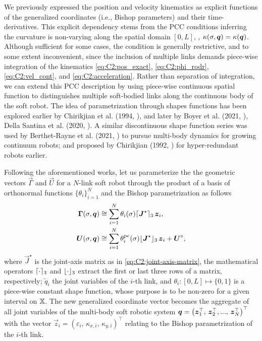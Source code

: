 \noindent We previously expressed the position and velocity kinematics as explicit functions of the generalized coordinates (i.e., Bishop parameters) and their time-derivatives. This explicit dependency stems from the PCC conditions inferring the curvature is non-varying along the spatial domain $[0,L]$, \ie, $\kappa(\sigma,{\boldsymbol{q}}) = \kappa({\boldsymbol{q}})$. Although sufficient for some cases, the condition is generally restrictive, and to some extent inconvenient, since the inclusion of multiple links demands piece-wise integration of the kinematics \eqref{eq:C2:pos_exact}, \eqref{eq:C2:phi_rodr}, \eqref{eq:C2:vel_cont}, and \eqref{eq:C2:acceleration}. Rather than separation of integration, we can extend this PCC description by using piece-wise continuous spatial function to distinguishes multiple soft-bodied links along the continuous body of the soft robot. The idea of parametrization through shapes functions has been explored earlier by Chirikjian et al. (1994,
\cite{Chirikjian1994,Chirikjian1992}), and later by Boyer et al. (2021, \cite{Boyer2021}), Della Santina et al. (2020, \cite{DellaSantina2020}). A similar discontinuous shape function series was used by Berthet-Rayne et al. (2021, \cite{Berthet2021}) to pursue multi-body dynamics for growing continuum robots; and proposed by Chirikjian (1992,
\cite{Chirikjian1992}) for hyper-redundant robots earlier.

Following the aforementioned works, let us parameterize the the geometric vectors $\vec{\Gamma}$ and $\vec{U}$ for a $N$-link soft robot through the product of a basis of orthonormal functions $\!\{\theta_i\}_{i=1}^{N}$ and the Bishop parametrization as follows
%
\begin{align} \boldsymbol{\Gamma}(\sigma,{\boldsymbol{q}}) & \cong \sum^N_{i=1} \theta_i(\sigma) \lceil{\boldsymbol{J}}^\star\rceil_3
\,\boldsymbol{z}_i, \label{eq:C2:theta_extent} \\ \boldsymbol{U}(\sigma,{\boldsymbol{q}}) & \cong \sum^N_{i=1} \theta^{\textrm{pc}}_i(\sigma)
\lfloor{\boldsymbol{J}}^\star\rfloor_3\,\boldsymbol{z}_i + {\boldsymbol{U}}^\circ, \label{eq:C2:h_extent} \end{align}
%
where $\vec{J}^\star$ is the joint-axis matrix as in \eqref{eq:C2:joint-axis-matrix}, the mathematical operators $\lceil\cdot\rceil_3$ and $\lfloor\cdot\rfloor_3$  extract the first or last three rows of a matrix, respectively;  $\tilde{q}_i$ the joint variables of the $i$-th link, and $\theta_i: [0,L] \mapsto \{0,1\}$ is a piece-wise constant shape function, whose purpose is to be non-zero for a given interval on
$\mathbb{X}$.
The new generalized coordinate vector becomes the aggregate of all joint variables of the multi-body soft robotic system ${\boldsymbol{q}} =  \left(\boldsymbol{z}_1^\top,\,\boldsymbol{z}_2^\top,...,\,\boldsymbol{z}_N^\top \right)^\top$ with the vector $\vec{z}_i = (\varepsilon_{i},\, \kappa_{x,i},\,\kappa_{y,i})^\top$ relating to the Bishop parametrization of the $i$-th link.

